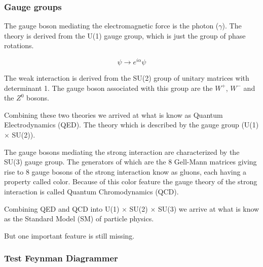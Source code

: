 
\subsubsection{Gauge groups}
The gauge boson mediating the electromagnetic force is the photon ($\gamma$). The theory is derived from the U(1) gauge group, which is just the group of phase rotations.

\begin{equation}
    \psi \rightarrow e^{i\alpha} \psi
\end{equation}

The weak interaction is derived from the SU(2) group of unitary matrices with determinant 1. The gauge boson associated with this group are the $W^+$, $W^-$ and the $Z^0$ bosons.

Combining these two theories we arrived at what is know as Quantum Electrodynamics (QED). The theory which is described by the gauge group (U(1) $\times$ SU(2)).

The gauge bosons mediating the strong interaction are characterized by the SU(3) gauge group. The generators of which are the 8 Gell-Mann matrices giving rise to 8 gauge bosons of the strong interaction know as gluons, each having a property called color. Because of this color feature the gauge theory of the strong interaction is called Quantum Chromodynamics (QCD).

Combining QED and QCD into U(1) $\times$ SU(2) $\times$ SU(3) we arrive at what is know as the Standard Model (SM) of particle physics.

But one important feature is still missing.


\subsubsection{Test Feynman Diagrammer}

